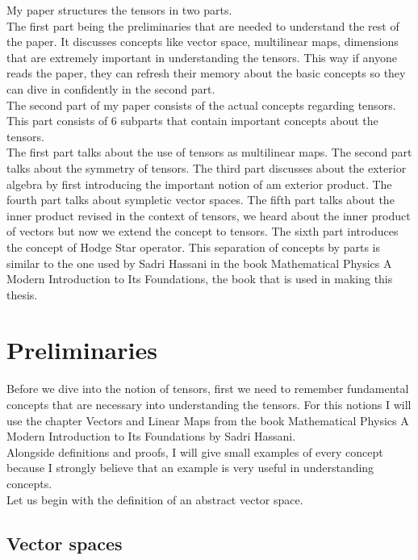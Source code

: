 \documentclass[12pt,a4paper]{article}
\begin{document}
My paper structures the tensors in two parts.\\The first part being the preliminaries that are needed to understand the rest of the paper. It discusses concepts like vector space, multilinear maps, dimensions that are extremely important in understanding the tensors. This way if anyone reads the paper, they can refresh their memory about the basic concepts so they can dive in confidently in the second part.\\
The second part of my paper consists of the actual concepts regarding tensors. This part consists of 6 subparts that contain important concepts about the tensors.\\The first part talks about the use of tensors as multilinear maps. The second part talks about the symmetry of tensors. The third part discusses about the exterior algebra by first introducing the important notion of am exterior product. The fourth part talks about sympletic vector spaces. The fifth part talks about the inner product revised in the context of tensors, we heard about the inner product of vectors but now we extend the concept to tensors. The sixth part introduces the concept of Hodge Star operator. This separation of concepts by parts is similar to the one used by Sadri Hassani in the book Mathematical Physics A Modern Introduction to Its Foundations, the book that is used in making this thesis. 
\newpage 
\section{Preliminaries}
Before we dive into the notion of tensors, first we need to remember fundamental concepts that are necessary into understanding the tensors. For this notions I will use the chapter Vectors and Linear Maps from the book Mathematical Physics A Modern Introduction to Its Foundations by Sadri Hassani. \\Alongside definitions and proofs, I will give small examples of every concept because I strongly believe that an example is very useful in understanding concepts.\\
Let us begin with the definition of an abstract vector space.

\subsection{Vector spaces}
\end{document}
